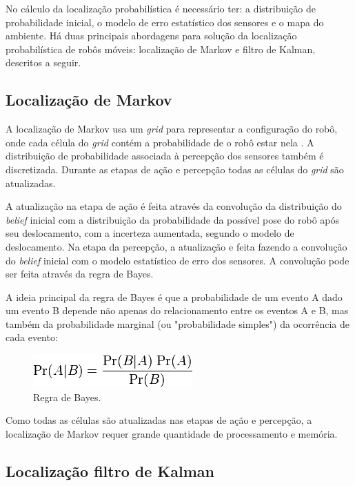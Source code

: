  No cálculo da localização probabilística é necessário ter: a distribuição de probabilidade inicial, 
 o modelo de erro estatístico dos sensores e o mapa do ambiente.
 Há duas principais abordagens para solução da localização probabilística de robôs móveis: 
 localização de Markov e filtro de Kalman, descritos a seguir.  
 
 \subsection{Localização de Markov}
	A localização de Markov usa um \textit{grid} para representar a configuração do robô, onde cada célula do \textit{grid}
	contém a probabilidade de o robô estar nela \cite{localization1}. A distribuição de probabilidade associada à percepção 
	dos sensores também é discretizada. Durante as etapas de ação e percepção todas as células do \textit{grid} são atualizadas. 
	
	A atualização na etapa de ação é feita através da convolução da distribuição do \textit{belief} inicial com a distribuição
	da probabilidade da possível pose do robô após seu deslocamento, com a incerteza aumentada, segundo o modelo de deslocamento.
	Na etapa da percepção, a atualização e feita fazendo a convolução do \textit{belief} inicial com o modelo estatístico de erro
	dos sensores. A convolução pode ser feita através da regra de Bayes\cite{localization1}.
	
	A ideia principal da regra de Bayes é que a probabilidade de um evento A dado um evento B 
	depende não apenas do relacionamento entre os eventos A e B, 
	mas também da probabilidade marginal (ou "probabilidade simples") da ocorrência de cada evento:
	
	\begin{figure}[hb]
	\centering
	\includegraphics[scale=0.7]{images/bayes.png}
	\caption{Regra de Bayes.}
	\label{fig:topologia}
	\end{figure}
	
	Como todas as células são atualizadas nas etapas de ação e percepção, a localização de Markov requer grande 
	quantidade de processamento e memória.
 
 \subsection{Localização filtro de Kalman}
 
